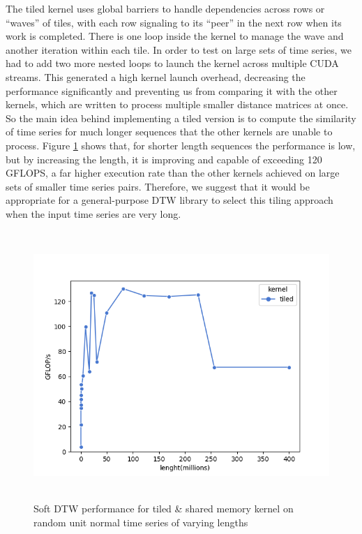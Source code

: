 \documentclass[12pt, letterpaper]{article}
\begin{document}
The tiled kernel uses global barriers to handle dependencies across rows or
``waves'' of tiles, with each row signaling to its ``peer'' in the next row when
its work is completed. There is one loop inside the kernel to manage the wave
and another iteration within each tile. In order to test on large sets of time
series, we had to add two more nested loops to launch the kernel across multiple
CUDA streams. This generated a high kernel launch overhead, decreasing the
performance significantly and preventing us from comparing it with the other
kernels, which are written to process multiple smaller distance matrices at
once. So the main idea behind implementing a tiled version is to compute the
similarity of time series for much longer sequences that the other kernels are
unable to process. Figure \ref{plot_tiled} shows that, for shorter length
sequences the performance is low, but by increasing the length, it is improving
and capable of exceeding 120 GFLOPS, a far higher execution rate than the other
kernels achieved on large sets of smaller time series pairs. Therefore, we
suggest that it would be appropriate for a general-purpose DTW library to select
this tiling approach when the input time series are very long.

\begin{figure}[htbp]
\includegraphics[height=4in]{fig/plot_tiled.png}
\centering
\caption{Soft DTW performance for tiled \& shared memory kernel on random unit
  normal time series of varying lengths}
\label{plot_tiled}
\end{figure}
\end{document}
